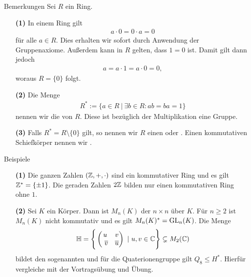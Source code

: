 \begin{genericdf}{Bemerkungen} \label{skript:7.2}
	Sei $ R $ ein Ring.
 	\begin{enumerate}
		\item[\textbf{(1)}]
		In einem Ring gilt
		\begin{align*}
		a \cdot 0 =0 \cdot a = 0 
		\end{align*}
		für alle $ a \in R $. Dies erhalten wir sofort durch Anwendung der Gruppenaxiome.
		Außerdem kann in $ R $ gelten, dass $ 1 = 0  $ ist.
		Damit gilt dann jedoch
		\begin{align*}
		a = a \cdot 1 = a \cdot 0 = 0,
		\end{align*}
		woraus $ R = \lbrace 0 \rbrace  $ folgt.
		
		\item[\textbf{(2)}]
		Die Menge 
		\begin{align*}
		R^\ast := \lbrace a \in R \ | \ \exists b \in R : ab = ba = 1 \rbrace
		\end{align*}
		nennen wir die  von $ R $. 
		Diese ist bezüglich der Multiplikation eine Gruppe.
		
		\item[\textbf{(3)}]
		Falls $ R^\ast = R \setminus \lbrace 0 \rbrace $ gilt, 
		so nennen wir $ R $ einen  oder .
		 
		Einen kommutativen Schiefkörper nennen wir . 
	\end{enumerate}
\end{genericdf}

\begin{genericdf}{Beispiele} \label{skript:7.3} \
	\begin{enumerate}
		\item[\textbf{(1)}]
		Die ganzen Zahlen $ (\mathbb{Z},+, \cdot) $ sind ein kommutativer Ring und es gilt
		$ \mathbb{Z}^\ast = \lbrace \pm 1 \rbrace $.
		Die geraden Zahlen $ 2 \mathbb{Z} $ bilden nur einen kommutativen Ring ohne $ 1 $.
		
		\item[\textbf{(2)}]
		Sei $ K $ ein Körper.
		Dann ist $ M_n(K) $ der $ n \times n  $  über $ K $.
		\index{Ring!Matrizen}
		Für $ n \geq 2  $ ist $ M_n(K) $ nicht kommutativ
		und es gilt $ M_n(K)^\ast = \operatorname{GL}_n(K) $.
		Die Menge 
		\begin{align*}
		\mathbb{H} = \Bigg\lbrace \begin{pmatrix}
		u & v \\ \
		\overline{v} & \overline{u}
		\end{pmatrix} 
		\ | \ u, v \in \mathbb{C} \Bigg\rbrace
		\subsetneq
		M_2(\mathbb{C})
		\end{align*}
		bildet den sogenannten  und für die
		Quaterionengruppe gilt $ Q_8 \leq H^\ast $.
		Hierfür vergleiche mit der Vortragsübung und Übung.
	\end{enumerate}	
\end{genericdf}

